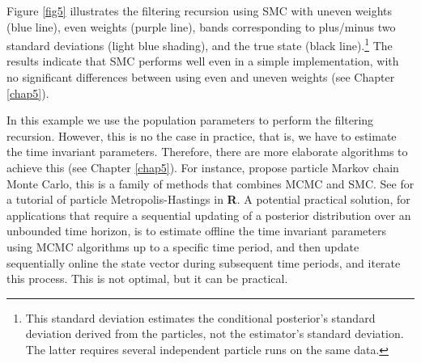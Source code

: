 Figure \ref{fig5} illustrates the filtering recursion using SMC with uneven weights (blue line), even weights (purple line), bands corresponding to plus/minus two standard deviations (light blue shading), and the true state (black line).\footnote{This standard deviation estimates the conditional posterior's standard deviation derived from the particles, not the estimator's standard deviation. The latter requires several independent particle runs on the same data.} The results indicate that SMC performs well even in a simple implementation, with no significant differences between using even and uneven weights (see Chapter \ref{chap5}).

In this example we use the population parameters to perform the filtering recursion. However, this is no the case in practice, that is, we have to estimate the time invariant parameters. Therefore, there are more elaborate algorithms to achieve this (see Chapter \ref{chap5}). For instance, \cite{andrieu2010pmcmc} propose particle Markov chain Monte Carlo, this is a family of methods that combines MCMC and SMC. See \cite{dahlin2019getting} for a tutorial of particle Metropolis-Hastings in \textbf{R}. A potential practical solution, for applications that require a sequential updating of a posterior distribution over an unbounded time horizon, is to estimate offline the time invariant parameters using MCMC algorithms up to a specific time period, and then update sequentially online the state vector during subsequent time periods, and iterate this process. This is not optimal, but it can be practical.  


